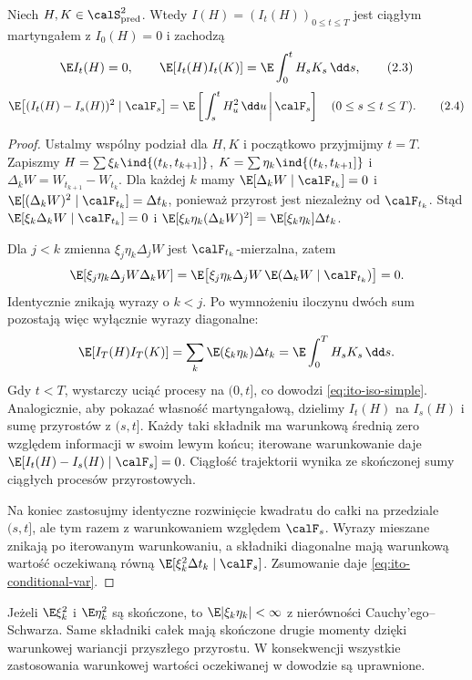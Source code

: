 \begin{twierdzenie}
\label{th:ito-simple-iso}
Niech $H,K\in\calS_{\mathrm{pred}}^2$. Wtedy
$I(H)=(I_t(H))_{0\le t\le T}$ jest ciągłym
martyngałem z $I_0(H)=0$ i zachodzą
\[
\E I_t(H)=0,\qquad
\E[I_t(H)I_t(K)]
=\E\int_0^tH_sK_s\,\dd s,
\tag{2.3}\label{eq:ito-iso-simple}
\]
\[
\E\big[(I_t(H)-I_s(H))^2\mid\calF_s\big]
=\E\left[\left.\int_s^tH_u^2\,\dd u\,\right|\calF_s\right]
\quad(0\le s\le t\le T).
\tag{2.4}\label{eq:ito-conditional-var}
\]
\end{twierdzenie}
\begin{proof}
Ustalmy wspólny podział dla $H,K$ i początkowo przyjmijmy
$t=T$. Zapiszmy $H=\sum\xi_k\ind{(t_k,t_{k+1}]}$,
$K=\sum\eta_k\ind{(t_k,t_{k+1}]}$ i
$\Delta_kW=W_{t_{k+1}}-W_{t_k}$.
Dla każdej $k$ mamy
$\E[\Delta_kW\mid\calF_{t_k}]=0$ i
$\E[(\Delta_kW)^2\mid\calF_{t_k}]=\Delta t_k$,
ponieważ przyrost jest niezależny od $\calF_{t_k}$.
Stąd
$\E[\xi_k\Delta_kW\mid\calF_{t_k}]=0$ i
$\E[\xi_k\eta_k(\Delta_kW)^2]=\E[\xi_k\eta_k]\Delta t_k$.

Dla $j<k$ zmienna $\xi_j\eta_k\Delta_jW$ jest
$\calF_{t_k}$-mierzalna, zatem
\[
\E[\xi_j\eta_k\Delta_jW\Delta_kW]
=\E\big[\xi_j\eta_k\Delta_jW\,
\E(\Delta_kW\mid\calF_{t_k})\big]=0.
\]
Identycznie znikają wyrazy o $k<j$.
Po wymnożeniu iloczynu dwóch sum pozostają więc
wyłącznie wyrazy diagonalne:
\[
\E[I_T(H)I_T(K)]
=\sum_k\E(\xi_k\eta_k)\Delta t_k
=\E\int_0^TH_sK_s\,\dd s.
\]
Gdy $t<T$, wystarczy uciąć procesy na $(0,t]$,
co dowodzi \eqref{eq:ito-iso-simple}. Analogicznie,
aby pokazać własność martyngałową, dzielimy $I_t(H)$
na $I_s(H)$ i sumę przyrostów z $(s,t]$. Każdy taki
składnik ma warunkową średnią zero względem informacji
w swoim lewym końcu; iterowane warunkowanie daje
$\E[I_t(H)-I_s(H)\mid\calF_s]=0$. Ciągłość trajektorii
wynika ze skończonej sumy ciągłych procesów przyrostowych.

Na koniec zastosujmy identyczne rozwinięcie kwadratu
do całki na przedziale $(s,t]$, ale tym razem z warunkowaniem
względem $\calF_s$. Wyrazy mieszane znikają po iterowanym
warunkowaniu, a składniki diagonalne mają warunkową
wartość oczekiwaną równą
$\E[\xi_k^2\Delta t_k\mid\calF_s]$.
Zsumowanie daje \eqref{eq:ito-conditional-var}.
\end{proof}

\begin{uwaga}
Jeżeli $\E\xi_k^2$ i $\E\eta_k^2$ są skończone,
to $\E|\xi_k\eta_k|<\infty$ z nierówności
Cauchy'ego--Schwarza. Same składniki całek mają skończone
drugie momenty dzięki warunkowej wariancji przyszłego
przyrostu. W konsekwencji wszystkie zastosowania
warunkowej wartości oczekiwanej w dowodzie są uprawnione.
\end{uwaga}

